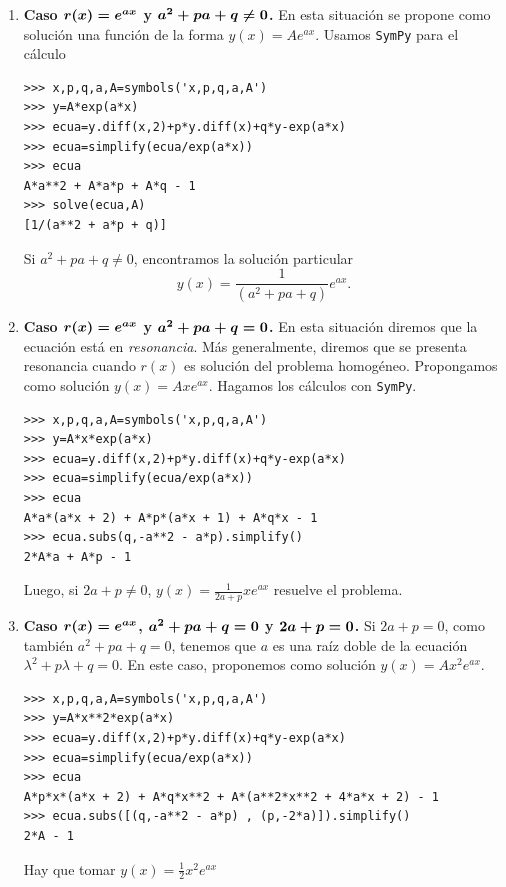 \begin{enumerate}
\item \textbf{Caso $\b{r(x)=e^{a x}}$ y $\b{a^2+pa+q\neq 0}$.}
En esta situación se propone como solución una función de la forma $\boxed{y(x)=Ae^{ax}}$. Usamos \texttt{SymPy} para el cálculo
\begin{lstlisting}
>>> x,p,q,a,A=symbols('x,p,q,a,A')
>>> y=A*exp(a*x)
>>> ecua=y.diff(x,2)+p*y.diff(x)+q*y-exp(a*x)
>>> ecua=simplify(ecua/exp(a*x))
>>> ecua
A*a**2 + A*a*p + A*q - 1
>>> solve(ecua,A)
[1/(a**2 + a*p + q)]
\end{lstlisting}


Si $a^2+pa+q\neq 0$, encontramos la solución particular
\[\boxed{y(x)=\frac{1}{(a^2+pa+q)}e^{ax}}.\]
\item \textbf{Caso $\b{r(x)=e^{a x}}$ y $\b{a^2+pa+q= 0}$.}
En esta situación diremos que la ecuación está en \emph{resonancia}. Más generalmente, diremos que se presenta resonancia cuando $r(x)$ es solución
del problema homogéneo.
Propongamos como solución $y(x)=Axe^{ax}$. Hagamos los cálculos con \texttt{SymPy}.


\begin{lstlisting}
>>> x,p,q,a,A=symbols('x,p,q,a,A')
>>> y=A*x*exp(a*x)
>>> ecua=y.diff(x,2)+p*y.diff(x)+q*y-exp(a*x)
>>> ecua=simplify(ecua/exp(a*x))
>>> ecua
A*a*(a*x + 2) + A*p*(a*x + 1) + A*q*x - 1
>>> ecua.subs(q,-a**2 - a*p).simplify()
2*A*a + A*p - 1

\end{lstlisting}

Luego, si $2a+p\neq 0$, $\boxed{y(x)=\frac{1}{2a+p}xe^{ax}}$ resuelve el problema.





\item \textbf{Caso $\b{r(x)=e^{a x}}$, $\b{a^2+pa+q= 0}$ y $ \b{2a+p=0}$.}
Si $2a+p=0$, como también $a^2+pa+q=0$, tenemos que $a$ es una raíz doble de la ecuación $\lambda^2+p\lambda+q=0$.
En este caso, proponemos como solución $y(x)=Ax^2e^{ax}$.

\begin{lstlisting}
>>> x,p,q,a,A=symbols('x,p,q,a,A')
>>> y=A*x**2*exp(a*x)
>>> ecua=y.diff(x,2)+p*y.diff(x)+q*y-exp(a*x)
>>> ecua=simplify(ecua/exp(a*x))
>>> ecua
A*p*x*(a*x + 2) + A*q*x**2 + A*(a**2*x**2 + 4*a*x + 2) - 1
>>> ecua.subs([(q,-a**2 - a*p) , (p,-2*a)]).simplify()
2*A - 1
\end{lstlisting}

Hay que tomar $\boxed{y(x)=\frac{1}{2}x^2e^{ax}}$








\end{enumerate}
